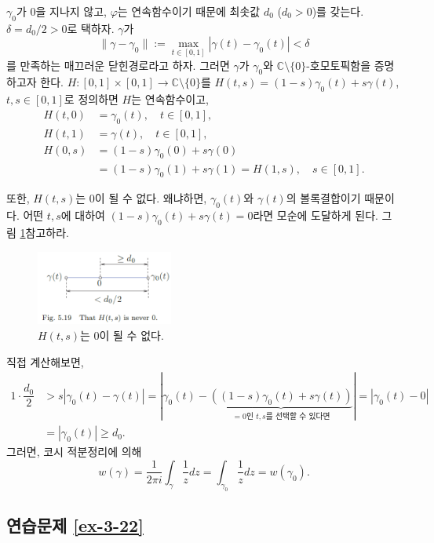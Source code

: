 \begin{itemize}
$\gamma_0$가 $0$을 지나지 않고, $\varphi$는 연속함수이기 때문에
최솟값 $d_0$ ($d_0>0$)를 갖는다.
$\delta = d_0/2 >0$로 택하자.
$\gamma$가 
\[
\|\gamma - \gamma_0\| := \max_{t\in[0,1]} | \gamma(t) - \gamma_0(t)| < \delta
\]
를 만족하는 매끄러운 닫힌경로라고 하자.
그러면
$\gamma$가 $\gamma_0$와 $\mathbb C\setminus \{0\}$-호모토픽함을 증명하고자 한다.
$H:[0,1]\times[0,1]\to \mathbb C\setminus\{0\}$를 
$H(t,s) = (1-s)\gamma_0(t) + s\gamma(t)$, $t,s\in[0,1]$로 정의하면
$H$는 연속함수이고,
\begin{align*}
H(t,0) &= \gamma_0(t), \quad t\in[0,1],\\
H(t,1) &= \gamma(t), \quad t\in[0,1],\\
H(0,s) &= (1-s)\gamma_0(0) + s\gamma(0) \\
&= (1-s)\gamma_0(1) + s\gamma(1)  = H(1,s), \quad s\in[0,1].
\end{align*}

또한, $H(t,s)$는 $0$이 될 수 없다. 왜냐하면,
$\gamma_0(t)$와 $\gamma(t)$의 볼록결합이기 때문이다.
어떤 $t,s$에 대하여 $(1-s)\gamma_0(t)+s\gamma(t)=0$라면
모순에 도달하게 된다. 그림 \ref{fig-5-19}\를 참고하라.

\begin{figure}[h!]
\begin{center}
\includegraphics[width=0.4\textwidth]{./figs/fig-5-19}
\end{center}
\caption{$H(t,s)$는 $0$이 될 수 없다.}
\label{fig-5-19}
\end{figure}
직접 계산해보면,
\begin{align*}
1\cdot \dfrac{d_0}2 &> s|\gamma_0(t) - \gamma(t)|
= | \gamma_0(t) - 
\underbrace{((1-s)\gamma_0(t) + s\gamma(t))}_{=0\text{인 $t,s$를 선택할 수 있다면}}
| = |\gamma_0(t) - 0| \\
&= |\gamma_0(t)| \ge d_0.
\end{align*}
그러면, 코시 적분정리에 의해
\[
w(\gamma) = \dfrac1{2\pi i} \int_\gamma \dfrac1z dz 
= \int_{\gamma_0} \dfrac1z dz  = w(\gamma_0).
\]
\end{itemize}

\subsection*{연습문제 \ref{ex-3-22}}

